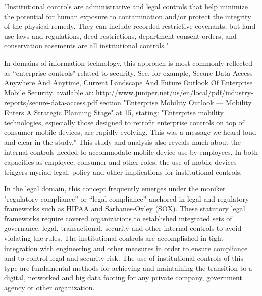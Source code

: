 "Institutional controls are administrative and legal controls that help minimize the potential for human exposure to contamination and/or protect the integrity of the physical remedy. They can include recorded restrictive covenants, but land use laws and regulations, deed restrictions, department consent orders, and conservation easements are all institutional controls."

In domains of information technology, this approach is most commonly reflected as “enterprise controls" related to security.
See, for example, Secure Data Access Anywhere And Anytime, Current Landscape And Future Outlook Of Enterprise Mobile Security. available at: http://www.juniper.net/us/en/local/pdf/industry-reports/secure-data-access.pdf section "Enterprise Mobility Outlook — Mobility Enters A Strategic Planning Stage" at 15, stating: "Enterprise mobility technologies, especially those designed to retrofit enterprise controls on top of consumer mobile devices, are rapidly evolving. This was a message we heard loud and clear in the study."
This study and analysis also reveals much about the internal controls needed to accommodate mobile device use by employees.
In both capacities as employee, consumer and other roles, the use of mobile devices triggers myriad legal, policy and other implications for institutional controls.

In the legal domain, this concept frequently emerges under the moniker "regulatory compliance” or “legal compliance” anchored in legal and regulatory frameworks such as HIPAA and Sarbanes-Oxley (SOX).
These statutory legal frameworks require covered organizations to established integrated sets of governance, legal, transactional, security and other internal controls to avoid violating the rules.
The institutional controls are accomplished in tight integration with engineering and other measures in order to ensure compliance and to control legal and security risk.
The use of institutional controls of this type are fundamental methods for achieving and maintaining the transition to a digital, networked and big data footing for any private company, government agency or other organization.

